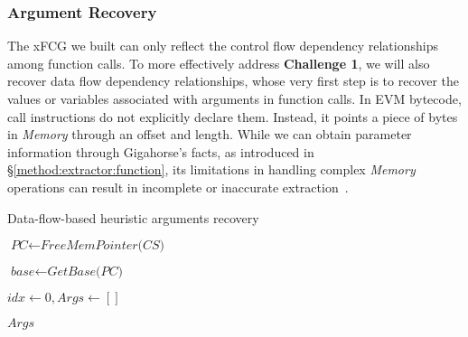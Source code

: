 \subsubsection{Argument Recovery}
\label{lab:argu}
The xFCG we built can only reflect the control flow dependency relationships among function calls. To more effectively address \textbf{Challenge 1}, we will also recover data flow dependency relationships, whose very first step is to recover the values or variables associated with arguments in function calls.
In EVM bytecode, call instructions do not explicitly declare them. Instead, it points a piece of bytes in \textit{Memory} through an offset and length.
While we can obtain parameter information through Gigahorse's facts, as introduced in \S\ref{method:extractor:function}, its limitations in handling complex \textit{Memory} operations can result in incomplete or inaccurate extraction~\cite{grech2019gigahorse, zhang2023bian}.

\vspace{-0.1in}
\begin{algorithm}
\small
{}
\caption{Data-flow-based heuristic arguments recovery}
\label{algo:extract}
\SetAlFnt{\ttfamily} 
$\textit{PC} \leftarrow \textit{FreeMemPointer(CS)} $

$\textit{base} \leftarrow \textit{GetBase(PC)} $

$\textit{idx} \leftarrow 0, \textit{Args} \leftarrow []$

\Return $\textit{Args}$
\end{algorithm}
\vspace{-0.1in}

